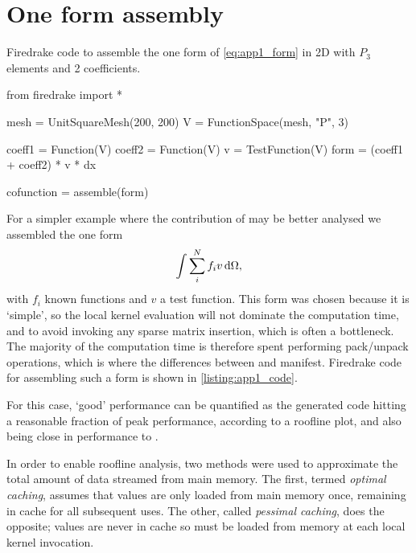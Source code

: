 \documentclass[thesis]{subfiles}
\begin{document}
\section{One form assembly}
\label{sec:demo_apps_one_form_assembly}

\begin{listing}
  \centering
  \caption{
    Firedrake code to assemble the one form of \cref{eq:app1_form} in 2D with $P_3$ elements and 2 coefficients.
  }
  \begin{minipage}{.9\textwidth}
    \begin{pyalg2}
      from firedrake import *

      mesh = UnitSquareMesh(200, 200)
      V = FunctionSpace(mesh, "P", 3)

      coeff1 = Function(V)
      coeff2 = Function(V)
      v = TestFunction(V)
      form = (coeff1 + coeff2) * v * dx

      cofunction = assemble(form)
    \end{pyalg2}
  \end{minipage}
  \label{listing:app1_code}
\end{listing}

For a simpler example where the contribution of  may be better analysed we assembled the one form
\begin{equation}
  \label{eq:app1_form}
  \int \sum_i^N f_i v\, \textnormal{d}\Omega,
\end{equation}
with $f_i$ known functions and $v$ a test function.
This form was chosen because it is `simple', so the local kernel evaluation will not dominate the computation time, and to avoid invoking any sparse matrix insertion, which is often a bottleneck.
The majority of the computation time is therefore spent performing pack/unpack operations, which is where the differences between  and  manifest.
Firedrake code for assembling such a form is shown in \cref{listing:app1_code}.

For this case, `good' performance can be quantified as the generated code hitting a reasonable fraction of peak performance, according to a roofline plot, and also being close in performance to .

In order to enable roofline analysis, two methods were used to approximate the total amount of data streamed from main memory.
The first, termed \emph{optimal caching}, assumes that values are only loaded from main memory once, remaining in cache for all subsequent uses.
The other, called \emph{pessimal caching}, does the opposite; values are never in cache so must be loaded from memory at each local kernel invocation.
\end{document}
